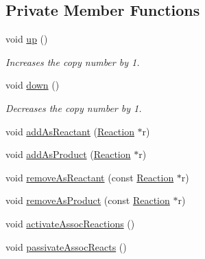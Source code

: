 \subsection*{Private Member Functions}
\begin{DoxyCompactItemize}
\item 
void \hyperlink{group__Chemistry_gaf2f80e6398e7898a1f2af83445cc08ed}{up} ()
\begin{DoxyCompactList}\small\item\em Increases the copy number by 1. \end{DoxyCompactList}\item 
void \hyperlink{group__Chemistry_ga04880f9d575ca66ff33399ac0a2fb88e}{down} ()
\begin{DoxyCompactList}\small\item\em Decreases the copy number by 1. \end{DoxyCompactList}\item 
void \hyperlink{group__Chemistry_ga6fee690741da9669da13f21c300a0874}{add\-As\-Reactant} (\hyperlink{classReaction}{Reaction} $\ast$r)
\item 
void \hyperlink{group__Chemistry_ga081600e8a161f37b8598f85f426265d2}{add\-As\-Product} (\hyperlink{classReaction}{Reaction} $\ast$r)
\item 
void \hyperlink{group__Chemistry_ga9878701daf45bb766200527375a0f6f4}{remove\-As\-Reactant} (const \hyperlink{classReaction}{Reaction} $\ast$r)
\item 
void \hyperlink{group__Chemistry_gae37874775e33c9bd17918c1450d745fa}{remove\-As\-Product} (const \hyperlink{classReaction}{Reaction} $\ast$r)
\item 
void \hyperlink{group__Chemistry_gaadeaff0f2f010bc820baf204c3822e6d}{activate\-Assoc\-Reactions} ()
\item 
void \hyperlink{group__Chemistry_ga9b48b280ea3bd19adaf2432704355aa3}{passivate\-Assoc\-Reacts} ()
\end{DoxyCompactItemize}
